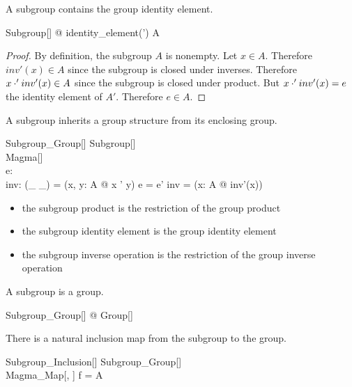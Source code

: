 \documentclass{amsart}
\begin{document}
\begin{remark}
A subgroup contains the group identity element.

\begin{zed}
	\forall Subgroup[\setT] @ identity\_element(\strucA') \in A
\end{zed}

\begin{proof}
By definition, the subgroup $A$ is nonempty. Let $x \in A$.
Therefore $inv'(x) \in A$ since the subgroup is closed under inverses.
Therefore $x \mathbin{\cdot}' inv'(x) \in A$ since the subgroup is closed under product.
But $x \mathbin{\cdot}' inv'(x) = e$ the identity element of $A'$. Therefore $e \in A$.
\end{proof}

\end{remark}

A subgroup inherits a group structure from its enclosing group.

\begin{schema}{Subgroup\_Group}[\genT]
	Subgroup[\genT] \\
	Magma[\genT] \\
	e: \genT \\
	inv: \genT \pfun \genT
\where
	(\_ \opG \_) = (\lambda x, y: A @ x \opG' y)
\also
	e = e'
\also
	inv = (\lambda x: A @ inv'(x))
\end{schema}

\begin{itemize}
	\item the subgroup product is the restriction of the group product
	\item the subgroup identity element is the group identity element
	\item the subgroup inverse operation is the restriction of the group inverse operation
\end{itemize}

\begin{remark}
A subgroup is a group.

\begin{zed}
	\forall Subgroup\_Group[\setT] @ Group[\setT]
\end{zed}

\end{remark}

There is a natural inclusion map from the subgroup to the group.

\begin{schema}{Subgroup\_Inclusion}[\genT]
	Subgroup\_Group[\genT] \\
	Magma\_Map[\genT, \genT]
\where
	f = \id A
\end{schema}
\end{document}
